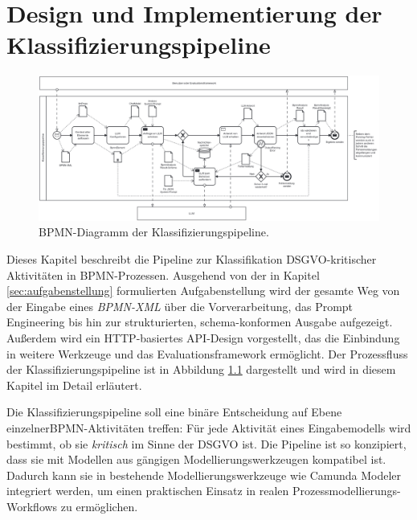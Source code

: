 \chapter{Design und Implementierung der Klassifizierungspipeline}\label{ch:klassifizierungsalgorithmus-(design-und-implementierung)}

\begin{figure}
    \centering
    \includegraphics[width=\textwidth]{images/classification/classification-pipeline-diagram}
    \caption{\ac{BPMN}-Diagramm der Klassifizierungspipeline.}
    \label{fig:architecture-diagram}
\end{figure}

Dieses Kapitel beschreibt die Pipeline zur Klassifikation \ac{DSGVO}-kritischer Aktivitäten in \ac{BPMN}-Prozessen. Ausgehend von der in Kapitel \ref{sec:aufgabenstellung} formulierten Aufgabenstellung wird der gesamte Weg von der Eingabe eines \emph{BPMN-XML} über die Vorverarbeitung, das Prompt Engineering bis hin zur strukturierten, schema-konformen Ausgabe aufgezeigt. Außerdem wird ein HTTP-basiertes API-Design vorgestellt, das die Einbindung in weitere Werkzeuge und das Evaluationsframework ermöglicht. Der Prozessfluss der Klassifizierungspipeline ist in Abbildung \ref{fig:architecture-diagram} dargestellt und wird in diesem Kapitel im Detail erläutert.

Die Klassifizierungspipeline soll eine binäre Entscheidung auf Ebene einzelner\linebreak\ac{BPMN}-Aktivitäten treffen: Für jede Aktivität eines Eingabemodells wird bestimmt, ob sie \emph{kritisch} im Sinne der \ac{DSGVO} ist. Die Pipeline ist so konzipiert, dass sie mit Modellen aus gängigen Modellierungswerkzeugen kompatibel ist. Dadurch kann sie in bestehende Modellierungswerkzeuge wie Camunda Modeler \cite{camunda} integriert werden, um einen praktischen Einsatz in realen Prozessmodellierungs-Workflows zu ermöglichen.








